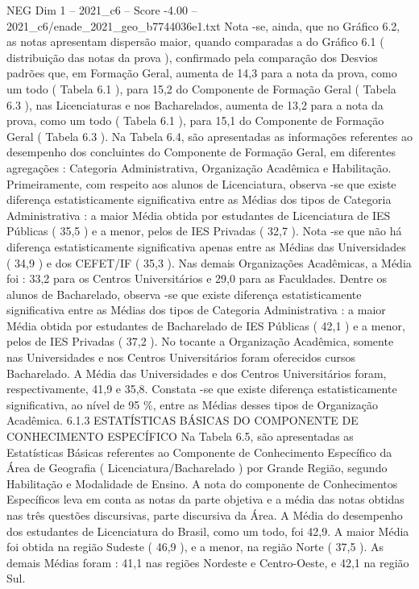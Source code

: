 \begin{textsample}{NEG Dim 1 – 2021\_c6 – Score -4.00 – 2021\_c6/enade\_2021\_geo\_b7744036e1.txt}
Nota -se, ainda, que no Gráfico 6.2, as notas apresentam dispersão maior, quando comparadas a do Gráfico 6.1 ( distribuição das notas da prova ), confirmado pela comparação dos Desvios padrões que, em Formação Geral, aumenta de 14,3 para a nota da prova, como um todo ( Tabela 6.1 ), para 15,2 do Componente de Formação Geral ( Tabela 6.3 ), nas Licenciaturas e nos Bacharelados, aumenta de 13,2 para a nota da prova, como um todo ( Tabela 6.1 ), para 15,1 do Componente de Formação Geral ( Tabela 6.3 ).
Na Tabela 6.4, são apresentadas as informações referentes ao desempenho dos concluintes do Componente de Formação Geral, em diferentes agregações : Categoria Administrativa, Organização Acadêmica e Habilitação.
Primeiramente, com respeito aos alunos de Licenciatura, observa -se que existe diferença estatisticamente significativa entre as Médias dos tipos de Categoria Administrativa : a maior Média obtida por estudantes de Licenciatura de IES Públicas ( 35,5 ) e a menor, pelos de IES Privadas ( 32,7 ).
Nota -se que não há diferença estatisticamente significativa apenas entre as Médias das Universidades ( 34,9 ) e dos CEFET/IF ( 35,3 ).
Nas demais Organizações Acadêmicas, a Média foi : 33,2 para os Centros Universitários e 29,0 para as Faculdades.
Dentre os alunos de Bacharelado, observa -se que existe diferença estatisticamente significativa entre as Médias dos tipos de Categoria Administrativa : a maior Média obtida por estudantes de Bacharelado de IES Públicas ( 42,1 ) e a menor, pelos de IES Privadas ( 37,2 ).
No tocante a Organização Acadêmica, somente nas Universidades e nos Centros Universitários foram oferecidos cursos Bacharelado.
A Média das Universidades e dos Centros Universitários foram, respectivamente, 41,9 e 35,8.
Constata -se que existe diferença estatisticamente significativa, ao nível de 95 \%, entre as Médias desses tipos de Organização Acadêmica. 6.1.3 ESTATÍSTICAS BÁSICAS DO COMPONENTE DE CONHECIMENTO ESPECÍFICO Na Tabela 6.5, são apresentadas as Estatísticas Básicas referentes ao Componente de Conhecimento Específico da Área de Geografia ( Licenciatura/Bacharelado ) por Grande Região, segundo Habilitação e Modalidade de Ensino.
A nota do componente de Conhecimentos Específicos leva em conta as notas da parte objetiva e a média das notas obtidas nas três questões discursivas, parte discursiva da Área.
A Média do desempenho dos estudantes de Licenciatura do Brasil, como um todo, foi 42,9.
A maior Média foi obtida na região Sudeste ( 46,9 ), e a menor, na região Norte ( 37,5 ).
As demais Médias foram : 41,1 nas regiões Nordeste e Centro-Oeste, e 42,1 na região Sul.

\end{textsample}
